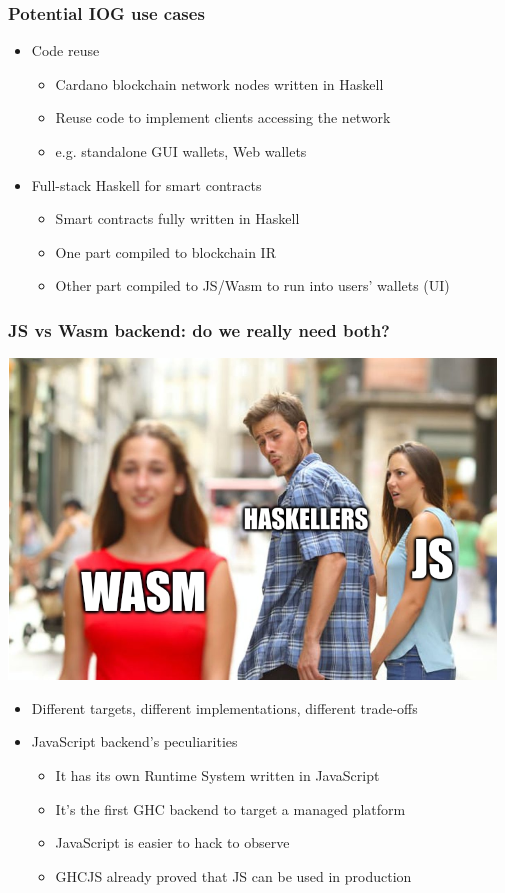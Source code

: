 \documentclass{beamer}
\begin{document}
\begin{frame}
\frametitle{Potential IOG use cases}
\begin{itemize}
\item Code reuse
\begin{itemize}
\item Cardano blockchain network nodes written in Haskell
\item Reuse code to implement clients accessing the network
\item e.g. standalone GUI wallets, Web wallets
\end{itemize}
\item Full-stack Haskell for smart contracts
\begin{itemize}
\item Smart contracts fully written in Haskell
\item One part compiled to blockchain IR
\item Other part compiled to JS/Wasm to run into users’ wallets (UI)
\end{itemize}
\end{itemize}
\end{frame}


\begin{frame}
\frametitle{ JS vs Wasm backend: do we really need both?}
\begin{center}
\includegraphics[scale=0.2]{images/js_vs_wasm.png}
\end{center}
\begin{itemize}
\item Different targets, different implementations, different trade-offs
\item JavaScript backend’s peculiarities
\begin{itemize}
\item It has its own Runtime System written in JavaScript
\item It’s the first GHC backend to target a managed platform
\item JavaScript is easier to hack to observe
\item GHCJS already proved that JS can be used in production
\end{itemize}
\end{itemize}
\end{frame}
\end{document}
